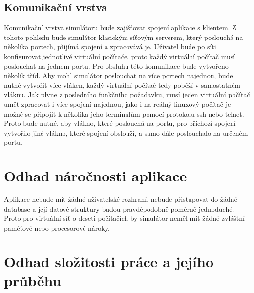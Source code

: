 \subsection{Komunikační vrstva}
Komunikační vrstva simulátoru bude zajišťovat spojení aplikace s klientem. Z tohoto pohledu bude simulátor klasickým síťovým serverem, který poslouchá na několika portech, přijímá spojení a zpracovává je. Uživatel bude po síti konfigurovat jednotlivé virtuální počítače, proto každý virtuální počítač musí poslouchat na jednom portu. Pro obsluhu této komunikace bude vytvořeno několik tříd. Aby mohl simulátor poslouchat na více portech najednou, bude nutné vytvořit více vláken, každý virtuální počítač tedy poběží v samostatném vláknu. Jak plyne z posledního funkčního požadavku, musí jeden virtuální počítač umět zpracovat i více spojení najednou, jako i na reálný linuxový počítač je možné se připojit k několika jeho terminálům pomocí protokolu ssh nebo telnet. Proto bude nutné, aby vlákno, které poslouchá na portu, pro příchozí spojení vytvořilo jiné vlákno, které spojení obslouží, a samo dále poslouchalo na určeném portu. 




\section{Odhad náročnosti aplikace}

Aplikace nebude mít žádné uživatelské rozhraní, nebude přistupovat do žádné database a její datové struktury budou pravděpodobně poměrně jednoduché. Proto pro virtuální síť o deseti počítačích by simulátor neměl mít žádné zvláštní paměťové nebo procesorové nároky.




\section{Odhad složitosti práce a jejího průběhu}
